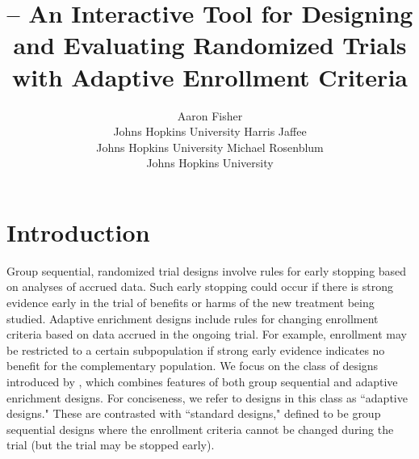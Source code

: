 \documentclass[article]{jss}
\title{\pkg{interAdapt} – An Interactive Tool for Designing and Evaluating Randomized Trials with Adaptive Enrollment Criteria}
\date{}
\author{Aaron Fisher \\Johns Hopkins University \And Harris Jaffee \\Johns Hopkins University \And Michael Rosenblum\\Johns Hopkins University}
\newcommand{\htx}[2]{\hspace{ #1 cm} \text{ #2 } }
\begin{document}
\maketitle








\section*{Introduction} \label{sec:intro}
Group sequential, randomized trial designs involve rules for early stopping based on analyses of accrued data. Such early stopping could occur if there is strong evidence early in the trial of benefits or harms of the new treatment being studied. Adaptive enrichment designs include rules for changing enrollment criteria based on data accrued in the ongoing trial. For example, enrollment may be restricted to a certain subpopulation if strong early evidence indicates no benefit for the complementary population.
We focus on the  class of designs introduced by \cite{Rosenblum2013AdaptMISTIE}, which combines features of both group sequential and adaptive enrichment designs. For conciseness, we refer to designs in this class as  ``adaptive designs."
These are contrasted with ``standard designs," 
defined to  be group sequential designs where the enrollment criteria cannot be changed during the trial (but the trial may be stopped early). 
\end{document}
